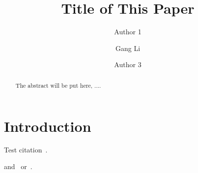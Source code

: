 \documentclass{amsart}
\begin{document}
%
%
\title[A Short Running Title]{Title of This Paper}%

\author{Author 1}
\address[A.~1]{School of Computer Science,\\ 
Xi'an Shiyou University, Shaanxi 710065, China}%

\author{Gang Li}
\address[A.~2]{School of Information Technology \\
Deakin University, Geelong, VIC 3216, Australia}%


\author{Author 3}
\address[A.~3]{School of Information Technology \\
Deakin University \\
Vic 3125, Australia}%

%
\date{\gitAuthorDate}%


\begin{abstract}
	The abstract will be put here, ....
\end{abstract}

%


\maketitle
\tableofcontents

\newpage

\section{Introduction}\label{sec-intro}


\blindtext


\blindtext

\blindtext

\blindtext

\blindtext



Test citation~\cite{BL12J01}. 
\begin{JournalOnly}
	and~\citep{BJL11J01} or~\citet{BJL11J01}.
\end{JournalOnly}
\end{document}
